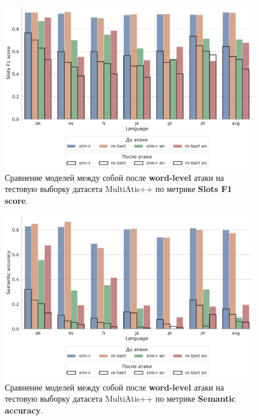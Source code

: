 \begin{figure}[H]
    \centering
    \includegraphics[width=\textwidth]{images/4}
    \caption{Сравнение моделей между собой после \textbf{word-level} атаки на тестовую выборку датасета MultiAtis++ по метрике \textbf{Slots F1 score}.}\label{fig:figure4}
\end{figure}
\begin{figure}[H]
    \centering
    \includegraphics[width=\textwidth]{images/5}
    \caption{Сравнение моделей между собой после \textbf{word-level} атаки на тестовую выборку датасета MultiAtis++ по метрике \textbf{Semantic accuracy}.}\label{fig:figure5}
\end{figure}

